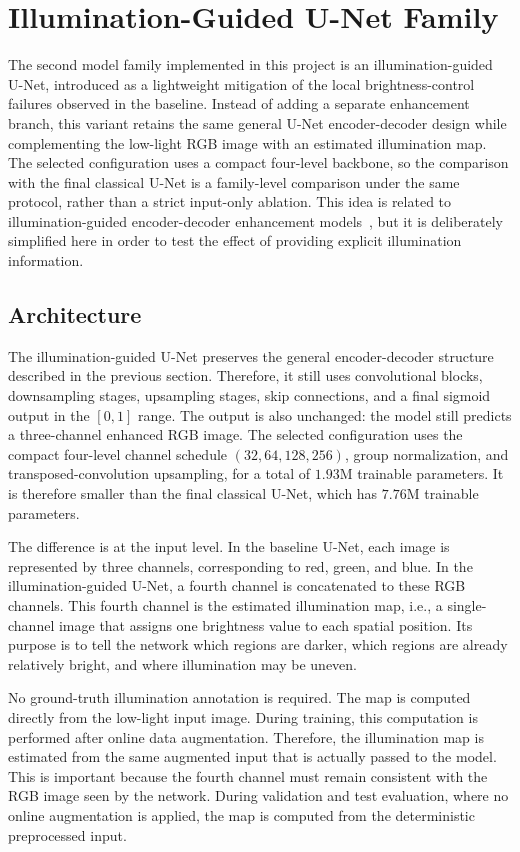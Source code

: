 \section{Illumination-Guided U-Net Family}

The second model family implemented in this project is an illumination-guided U-Net, introduced as a lightweight mitigation of the local brightness-control failures observed in the baseline. Instead of adding a separate enhancement branch, this variant retains the same general U-Net encoder-decoder design while complementing the low-light RGB image with an estimated illumination map. The selected configuration uses a compact four-level backbone, so the comparison with the final classical U-Net is a family-level comparison under the same protocol, rather than a strict input-only ablation. This idea is related to illumination-guided encoder-decoder enhancement models~\cite{DBLP:journals/corr/abs-2507-13360}, but it is deliberately simplified here in order to test the effect of providing explicit illumination information.

\subsection{Architecture}

The illumination-guided U-Net preserves the general encoder-decoder structure described in the previous section. Therefore, it still uses convolutional blocks, downsampling stages, upsampling stages, skip connections, and a final sigmoid output in the $[0,1]$ range. The output is also unchanged: the model still predicts a three-channel enhanced RGB image. The selected configuration uses the compact four-level channel schedule $(32,64,128,256)$, group normalization, and transposed-convolution upsampling, for a total of $1.93$M trainable parameters. It is therefore smaller than the final classical U-Net, which has $7.76$M trainable parameters.

The difference is at the input level. In the baseline U-Net, each image is represented by three channels, corresponding to red, green, and blue. In the illumination-guided U-Net, a fourth channel is concatenated to these RGB channels. This fourth channel is the estimated illumination map, i.e., a single-channel image that assigns one brightness value to each spatial position. Its purpose is to tell the network which regions are darker, which regions are already relatively bright, and where illumination may be uneven.

No ground-truth illumination annotation is required. The map is computed directly from the low-light input image. During training, this computation is performed after online data augmentation. Therefore, the illumination map is estimated from the same augmented input that is actually passed to the model. This is important because the fourth channel must remain consistent with the RGB image seen by the network. During validation and test evaluation, where no online augmentation is applied, the map is computed from the deterministic preprocessed input.

